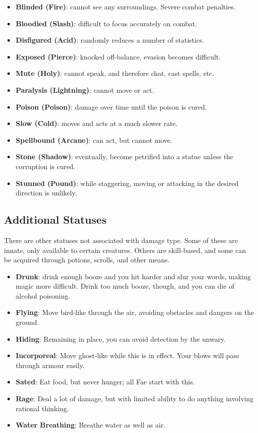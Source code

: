 \begin{itemize}
\item {\bf Blinded (Fire)}: cannot see any surroundings.  Severe combat 
penalties.
\item {\bf Bloodied (Slash)}: difficult to focus accurately on combat.  
\item {\bf Disfigured (Acid)}: randomly reduces a number of statistics.
\item {\bf Exposed (Pierce)}: knocked off-balance, evasion becomes 
difficult.  
\item {\bf Mute (Holy)}: cannot speak, and therefore chat, cast spells, 
etc.
\item {\bf Paralysis (Lightning)}: cannot move or act.
\item {\bf Poison (Poison)}: damage over time until the poison is cured.
\item {\bf Slow (Cold)}: moves and acts at a much slower rate.
\item {\bf Spellbound (Arcane)}: can act, but cannot move.
\item {\bf Stone (Shadow)}: eventually, become petrified into a statue 
unless the corruption is cured.
\item {\bf Stunned (Pound)}: while staggering, moving or attacking in the 
desired direction is unlikely.
\end{itemize}

\subsection{Additional Statuses}

There are other statuses not associated with damage type.  Some of these
are innate, only available to certain creatures.  Others are skill-based, 
and some can be acquired through potions, scrolls, and other means.  

\begin{itemize}
\item{\bf Drunk}: drink enough booze and you hit harder and slur your words,
making magic more difficult.  Drink too much booze, though, and you can die of
alcohol poisoning.
\item{\bf Flying}: Move bird-like through the air, avoiding obstacles and
dangers on the ground.
\item{\bf Hiding}: Remaining in place, you can avoid detection by the unwary.
\item{\bf Incorporeal}: Move ghost-like while this is in effect.  Your blows
will pass through armour easily.
\item{\bf Sated}: Eat food, but never hunger; all Fae start with this.
\item{\bf Rage}: Deal a lot of damage, but with limited ability to do anything
involving rational thinking.
\item{\bf Water Breathing}: Breathe water as well as air.
\end{itemize}

